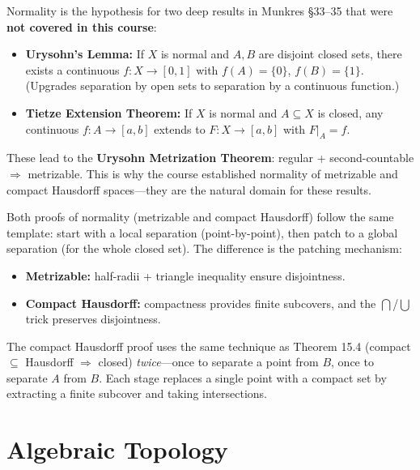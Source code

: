 \documentclass[11pt]{report}
\begin{document}
\begin{rembox}
Normality is the hypothesis for two deep results in Munkres \S 33--35 that were \textbf{not covered in this course}:
\begin{itemize}[nosep]
    \item \textbf{Urysohn's Lemma:} If $X$ is normal and $A, B$ are disjoint closed sets, there exists a continuous $f: X \to [0,1]$ with $f(A) = \{0\}$, $f(B) = \{1\}$. (Upgrades separation by open sets to separation by a continuous function.)
    \item \textbf{Tietze Extension Theorem:} If $X$ is normal and $A \subseteq X$ is closed, any continuous $f: A \to [a,b]$ extends to $F: X \to [a,b]$ with $F|_A = f$.
\end{itemize}
These lead to the \textbf{Urysohn Metrization Theorem}: regular + second-countable $\Rightarrow$ metrizable. This is why the course established normality of metrizable and compact Hausdorff spaces---they are the natural domain for these results.
\end{rembox}

\begin{rembox}
Both proofs of normality (metrizable and compact Hausdorff) follow the same template: start with a local separation (point-by-point), then patch to a global separation (for the whole closed set). The difference is the patching mechanism:
\begin{itemize}[nosep]
    \item \textbf{Metrizable:} half-radii + triangle inequality ensure disjointness.
    \item \textbf{Compact Hausdorff:} compactness provides finite subcovers, and the $\bigcap$/$\bigcup$ trick preserves disjointness.
\end{itemize}
The compact Hausdorff proof uses the same technique as Theorem 15.4 (compact $\subseteq$ Hausdorff $\Rightarrow$ closed) \emph{twice}---once to separate a point from $B$, once to separate $A$ from $B$. Each stage replaces a single point with a compact set by extracting a finite subcover and taking intersections.
\end{rembox}

\newpage
\part{Algebraic Topology}
\end{document}

